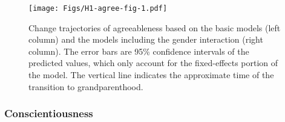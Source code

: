 \documentclass[
  english,
  man, noextraspace,floatsintext]{apa7}
\begin{document}
\begin{figure}
\centering
\texttt{[image: Figs/H1-agree-fig-1.pdf]}
\caption{\label{fig:H1-agree-fig}Change trajectories of agreeableness based on the basic models (left column) and the models including the gender interaction (right column). The error bars are 95\% confidence intervals of the predicted values, which only account for the fixed-effects portion of the model. The vertical line indicates the approximate time of the transition to grandparenthood.}
\end{figure}

\hypertarget{conscientiousness}{%
\subsubsection{Conscientiousness}\label{conscientiousness}}
\end{document}
